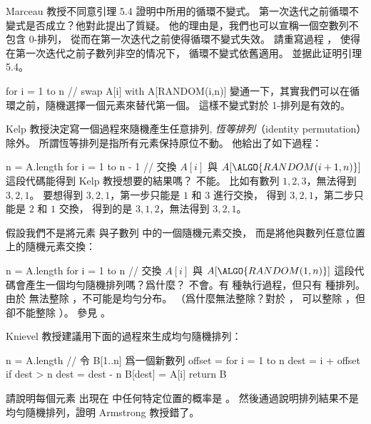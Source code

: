 \startsection[
  title={Randomized algorithms},
]

\startEXERCISE
Marceau 教授不同意引理 5.4 證明中所用的循環不變式。
第一次迭代之前循環不變式是否成立？他對此提出了質疑。
他的理由是，我們也可以宣稱一個空數列不包含 0-排列，
從而在第一次迭代之前使得循環不變式失效。
請重寫過程 ，
使得在第一次迭代之前子數列非空的情况下，
循環不變式依舊適用。
並据此证明引理 5.4。

\startCLRSCODE
for i = 1 to n
	// swap A[i] with A[RANDOM(i,n)]
\stopCLRSCODE
\stopEXERCISE
\startANSWER
變通一下，其實我們可以在循環之前，隨機選擇一個元素來替代第一個。
這樣不變式對於 1-排列是有效的。
\stopANSWER

\startEXERCISE
Kelp 教授決定寫一個過程來隨機產生任意排列,
\emph{恆等排列}（identity permutation）除外。
所謂恆等排列是指所有元素保持原位不動。
他給出了如下過程：

\startCLRSCODE
n = A.length
for i = 1 to n - 1
	// 交換 $A[i]$ 與 $A[\ALGO{RANDOM(i+1, n)}]$
\stopCLRSCODE
這段代碼能得到 Kelp 教授想要的結果嗎？
\stopEXERCISE
\startANSWER
不能。
比如有數列 $1,2,3$，無法得到 $3,2,1$。
要想得到 $3,2,1$，第一步只能是 $1$ 和 $3$ 進行交換，
得到 $3,2,1$，第二步只能是 $2$ 和 $1$ 交換，
得到的是 $3,1,2$，無法得到 $3,2,1$。
\stopANSWER

\startEXERCISE
假設我們不是將元素  與子數列  中的一個隨機元素交換，
而是將他與數列任意位置上的隨機元素交換：

\startCLRSCODE
n = A.length
for i = 1 to n
	// 交換 $A[i]$ 與 $A[\ALGO{RANDOM(1, n)}]$
\stopCLRSCODE
這段代碼會產生一個均勻隨機排列嗎？爲什麼？
\stopEXERCISE
\startANSWER
不會。有  種執行過程，但只有  種排列。
由於  無法整除 ，不可能是均勻分布。
（爲什麼無法整除？對於 ，  可以整除 ，但卻不能整除 ）。
參見 。
\stopANSWER

\startEXERCISE
Knievel 教授建議用下面的過程來生成均勻隨機排列：

\startCLRSCODE
n = A.length
// 令 B[1..n] 爲一個新數列
offset = 
for i = 1 to n
	dest = i + offset
	if dest > n
		dest = dest - n
	B[dest] = A[i]
return B
\stopCLRSCODE

請說明每個元素  出現在  中任何特定位置的概率是 。
然後通過說明排列結果不是均勻隨機排列，證明 Armstrong 教授錯了。
\stopEXERCISE

